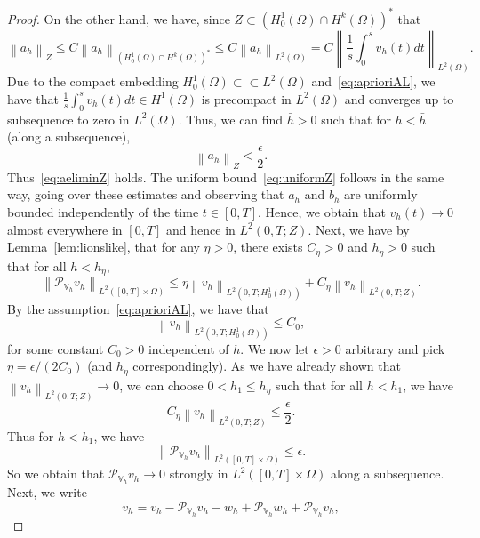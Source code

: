 \documentclass[10pt,a4paper]{amsart}
\newcommand\norm[1]{\left\lVert#1\right\rVert}
\newcommand{\PVh}{\mathcal{P}_{\Vh}}
\newcommand{\Vh}{\mathbb{V}_h}
\newcommand{\dom}{\Omega}
\begin{document}
\begin{proof}
	On the other hand, we have, since $Z\subset (H^1_0(\dom)\cap H^k(\dom))^*$ that
	\begin{equation*}
		\norm{a_h}_{Z}\leq C \norm{a_h}_{(H^1_0(\dom)\cap H^k(\dom))^*} \leq  C \norm{a_h}_{L^2(\dom)}= C \norm{\frac{1}{s}\int_0^s v_h(t)dt}_{L^2(\dom)}.%
	\end{equation*}
	Due to the compact embedding $H^1_0(\dom)\subset\subset L^2(\dom)$ and~\eqref{eq:aprioriAL}, we have that $\frac{1}{s}\int_0^s v_h(t)dt\in H^1(\dom)$ is precompact in $L^2(\dom)$ and converges up to subsequence to zero in $L^2(\dom)$.
	Thus, we can find $\bar{h}>0$ such that for $h<\bar{h}$ (along a subsequence),
	\begin{equation*}
		\norm{a_h}_{Z}<\frac{\epsilon}{2}.
	\end{equation*}
	Thus~\eqref{eq:aeliminZ} holds.
	The uniform bound~\eqref{eq:uniformZ} follows in the same way, going over these estimates and observing that $a_h$ and $b_h$ are uniformly bounded independently of the time $t\in [0,T]$. 
	Hence, we obtain that $v_h(t)\to 0$ almost everywhere in $[0,T]$ and hence in $L^2(0,T;Z)$.
	Next, we have by Lemma~\ref{lem:lionslike},  that for any $\eta>0$, there exists $C_{\eta}>0$ and $h_\eta>0$ such that for all $h<h_\eta$,
	\begin{equation*}
		\norm{\PVh v_h}_{L^2([0,T]\times\dom)}\leq \eta \norm{v_h}_{L^2(0,T;H^1_0(\dom))}+C_{\eta}\norm{v_h}_{L^2(0,T;Z)}.
	\end{equation*}
	By the assumption~\eqref{eq:aprioriAL}, we have that
	\begin{equation*}
		\norm{v_h}_{L^2(0,T;H^1_0(\dom))}\leq C_0,
	\end{equation*}
	for some constant $C_0>0$ independent of $h$. 
	We now let $\epsilon>0$ arbitrary and pick $\eta = \epsilon/(2 C_0)$ (and $h_\eta$ correspondingly). As we have already shown that $\norm{v_h}_{L^2(0,T;Z)}\to 0$, we can choose $0<h_1\leq h_\eta$ such that for all $h<h_1$, we have
	\begin{equation*}
		C_\eta\norm{v_h}_{L^2(0,T;Z)}\leq \frac{\epsilon}{2}.
	\end{equation*}
	Thus for $h<h_1$, we have
	\begin{equation}\label{eq:PVhvconv}
		\norm{\PVh v_h}_{L^2([0,T]\times\dom)}\leq \epsilon.
	\end{equation}
	So we obtain that $\PVh v_h \to 0$ strongly in $L^2([0,T]\times\dom)$ along a subsequence. Next, we write
	\begin{equation*}
		v_h = v_h - \PVh v_h -w_h +\PVh w_h +\PVh v_h,

\end{equation*}
\end{proof}
\end{document}
